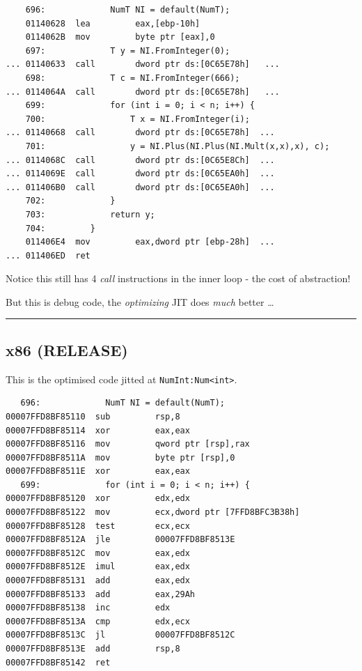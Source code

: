 \begin{lstlisting}
    696:             NumT NI = default(NumT);
    01140628  lea         eax,[ebp-10h]  
    0114062B  mov         byte ptr [eax],0  
    697:             T y = NI.FromInteger(0);
... 01140633  call        dword ptr ds:[0C65E78h]   ...
    698:             T c = NI.FromInteger(666);
... 0114064A  call        dword ptr ds:[0C65E78h]   ...  
    699:             for (int i = 0; i < n; i++) {
    700:                 T x = NI.FromInteger(i);
... 01140668  call        dword ptr ds:[0C65E78h]  ...
    701:                 y = NI.Plus(NI.Plus(NI.Mult(x,x),x), c);
... 0114068C  call        dword ptr ds:[0C65E8Ch]  ... 
... 0114069E  call        dword ptr ds:[0C65EA0h]  ...  
... 011406B0  call        dword ptr ds:[0C65EA0h]  ...
    702:             }
    703:             return y;
    704:         }
    011406E4  mov         eax,dword ptr [ebp-28h]  ... 
... 011406ED  ret  
\end{lstlisting}

Notice this still has 4 \emph{call} instructions in the inner loop - the
cost of abstraction!

But this is debug code, the \emph{optimizing} JIT does \emph{much}
better \ldots{}

\begin{center}\rule{0.5\linewidth}{\linethickness}\end{center}

\subsection{x86 (RELEASE)}\label{x86-release}

This is the optimised code jitted at \lstinline!NumInt:Num<int>!.

\begin{lstlisting}
   696:             NumT NI = default(NumT);
00007FFD8BF85110  sub         rsp,8  
00007FFD8BF85114  xor         eax,eax  
00007FFD8BF85116  mov         qword ptr [rsp],rax  
00007FFD8BF8511A  mov         byte ptr [rsp],0  
00007FFD8BF8511E  xor         eax,eax  
   699:             for (int i = 0; i < n; i++) {
00007FFD8BF85120  xor         edx,edx  
00007FFD8BF85122  mov         ecx,dword ptr [7FFD8BFC3B38h]  
00007FFD8BF85128  test        ecx,ecx  
00007FFD8BF8512A  jle         00007FFD8BF8513E  
00007FFD8BF8512C  mov         eax,edx  
00007FFD8BF8512E  imul        eax,edx  
00007FFD8BF85131  add         eax,edx  
00007FFD8BF85133  add         eax,29Ah  
00007FFD8BF85138  inc         edx  
00007FFD8BF8513A  cmp         edx,ecx  
00007FFD8BF8513C  jl          00007FFD8BF8512C  
00007FFD8BF8513E  add         rsp,8  
00007FFD8BF85142  ret  
\end{lstlisting}


